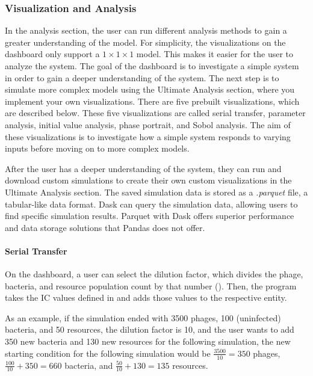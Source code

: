 \subsubsection{Visualization and Analysis}
In the analysis section, the user can run different analysis methods to gain a greater understanding of the model.
For simplicity, the visualizations on the dashboard only support a $1 \times 1\times 1$ model. 
This makes it easier for the user to analyze the system. 
The goal of the dashboard is to investigate a simple system in order to gain a deeper understanding of the system. 
The next step is to simulate more complex models using the Ultimate Analysis section, where you implement your own visualizations. 
There are five prebuilt visualizations, which are described below. 
These five visualizations are called serial transfer, parameter analysis, initial value analysis, phase portrait, and Sobol analysis. 
The aim of these visualizations is to investigate how a simple system responds to varying inputs before moving on to more complex models. 

After the user has a deeper understanding of the system, they can run and download custom simulations to create their own custom visualizations in the Ultimate Analysis section. 
The saved simulation data is stored as a \textit{.parquet} file, a tabular-like data format. 
Dask can query the simulation data, allowing users to find specific simulation results. 
Parquet with Dask offers superior performance and data storage solutions that Pandas does not offer.

\paragraph{Serial Transfer}
\label{sec:serial_transfer}
On the dashboard, a user can select the dilution factor, which divides the phage, bacteria, and resource population count by that number ().
Then, the program takes the IC values defined in  and adds those values to the respective entity. 

As an example, if the simulation ended with 3500 phages, 100 (uninfected) bacteria, and 50 resources, the dilution factor is 10, and the user wants to add 350 new bacteria and 130 new resources for the following simulation, the new starting condition for the following simulation would be $\frac{3500}{10} = 350$ phages, $\frac{100}{10} + 350 = 660$ bacteria, and $\frac{50}{10} + 130 = 135$ resources.

